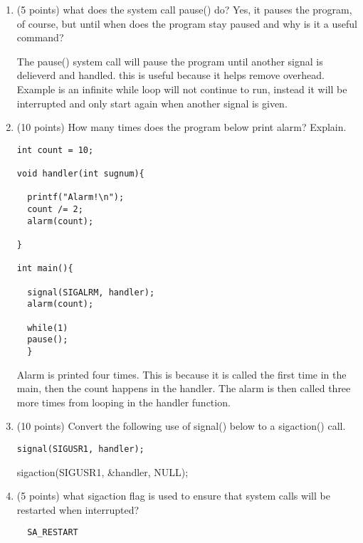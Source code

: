 \documentclass{article}[9pt]
\newenvironment{answerfont}{\fontfamily{qhv}\selectfont}{\par}
\newenvironment{myanswer}{\begin{mdframed}\begin{answerfont}}{\end{answerfont}\end{mdframed}}
\begin{document}
\begin{enumerate}
\item (5 points) what does the system call pause() do? Yes, it pauses the program, of course, but until when does the program stay paused and why is it a useful command?

  \begin{myanswer}
  The pause() system call will pause the program until another signal is delieverd and handled. this is useful because it helps remove overhead. Example is an infinite
  while loop will not continue to run, instead it will be interrupted and only start again when another signal is given.
  \end{myanswer}

\item (10 points) How many times does the program below print alarm? Explain.
\begin{verbatim}
int count = 10;

void handler(int sugnum){

  printf("Alarm!\n");
  count /= 2;
  alarm(count);

}

int main(){

  signal(SIGALRM, handler);
  alarm(count);

  while(1)
  pause();
  }
\end{verbatim}

  \begin{myanswer}
  Alarm is printed four times. This is because it is called the first time in the main, then the count happens in the handler. The alarm is then called three more times
  from looping in the handler function.
  \end{myanswer}

\item (10 points) Convert the following use of signal() below to a sigaction() call.
\begin{verbatim}
signal(SIGUSR1, handler);
\end{verbatim}

  \begin{myanswer}
  sigaction(SIGUSR1, &handler, NULL);
  \end{myanswer}

\item (5 points) what sigaction flag is used to ensure that system calls will be restarted when interrupted?

  \begin{myanswer}
  \begin{verbatim}
  SA_RESTART
  \end{verbatim}
  \end{myanswer}


\end{enumerate}
\end{document}
